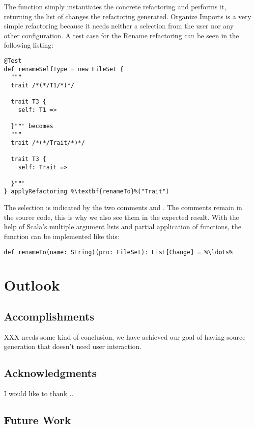 \documentclass[10pt,a4paper,oneside]{scrreprt}
\begin{document}
The  function simply instantiates the concrete refactoring and performs it, returning the list of changes the refactoring generated. Organize Imports is a very simple refactoring because it needs neither a selection from the user nor any other configuration. A test case for the Rename refactoring can be seen in the following listing:

\begin{lstlisting}
@Test
def renameSelfType = new FileSet {
  """
  trait /*(*/T1/*)*/

  trait T3 {
    self: T1 =>

  }""" becomes
  """
  trait /*(*/Trait/*)*/

  trait T3 {
    self: Trait =>

  }"""
} applyRefactoring %\textbf{renameTo}%("Trait")
\end{lstlisting}

The selection is indicated by the two comments \src{/*(*/} and \src{/*)*/}. The comments remain in the source code, this is why we also see them in the expected result. With the help of Scala's multiple argument lists and partial application of functions, the  function can be implemented like this:

\begin{lstlisting}
def renameTo(name: String)(pro: FileSet): List[Change] = %\ldots%
\end{lstlisting}


\chapter{Outlook}

\section{Accomplishments}

XXX needs some kind of conclusion, we have achieved our goal of having source generation that doesn't need user interaction.


\section{Acknowledgments}

I would like to thank ..

\section{Future Work}
\end{document}
